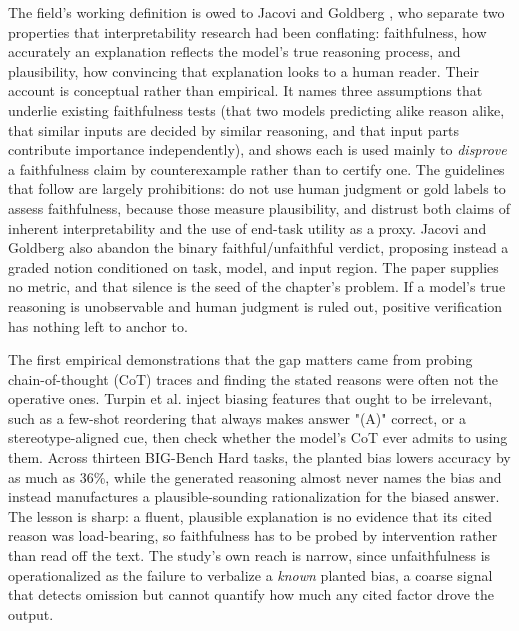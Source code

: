 \documentclass[conference]{IEEEtran}
\begin{document}
The field's working definition is owed to Jacovi and Goldberg \cite{ref30}, who separate two properties that interpretability research had been conflating: faithfulness, how accurately an explanation reflects the model's true reasoning process, and plausibility, how convincing that explanation looks to a human reader. Their account is conceptual rather than empirical. It names three assumptions that underlie existing faithfulness tests (that two models predicting alike reason alike, that similar inputs are decided by similar reasoning, and that input parts contribute importance independently), and shows each is used mainly to \textit{disprove} a faithfulness claim by counterexample rather than to certify one. The guidelines that follow are largely prohibitions: do not use human judgment or gold labels to assess faithfulness, because those measure plausibility, and distrust both claims of inherent interpretability and the use of end-task utility as a proxy. Jacovi and Goldberg also abandon the binary faithful/unfaithful verdict, proposing instead a graded notion conditioned on task, model, and input region. The paper supplies no metric, and that silence is the seed of the chapter's problem. If a model's true reasoning is unobservable and human judgment is ruled out, positive verification has nothing left to anchor to.

The first empirical demonstrations that the gap matters came from probing chain-of-thought (CoT) traces and finding the stated reasons were often not the operative ones. Turpin et al. \cite{ref28} inject biasing features that ought to be irrelevant, such as a few-shot reordering that always makes answer "(A)" correct, or a stereotype-aligned cue, then check whether the model's CoT ever admits to using them. Across thirteen BIG-Bench Hard tasks, the planted bias lowers accuracy by as much as 36\%, while the generated reasoning almost never names the bias and instead manufactures a plausible-sounding rationalization for the biased answer. The lesson is sharp: a fluent, plausible explanation is no evidence that its cited reason was load-bearing, so faithfulness has to be probed by intervention rather than read off the text. The study's own reach is narrow, since unfaithfulness is operationalized as the failure to verbalize a \textit{known} planted bias, a coarse signal that detects omission but cannot quantify how much any cited factor drove the output.
\end{document}
